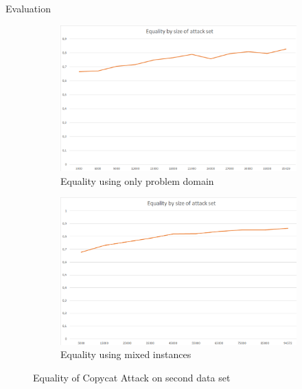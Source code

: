 \documentclass[10pt]{beamer}
\begin{document}
\begin{frame}[fragile]{Evaluation}
       \begin{figure}[h!]
            \centering
            \begin{subfigure}[c]{0.49\textwidth}
                \centering
                \includegraphics[width=1\textwidth]{exercise_3/paper/images/Equality_copy_cat_domain.png}
                \caption{Equality using only problem domain}
                \label{fig:Equality_cat_domain}
            \end{subfigure}
            \begin{subfigure}[c]{0.49\textwidth}
                \centering
                \includegraphics[width=1\textwidth]{exercise_3/paper/images/Equality_copy_cat.png}
                \caption{Equality using mixed instances}
                \label{fig:Equality_cat_mix}
            \end{subfigure}
            \caption{Equality of Copycat Attack on second data set}
            \label{fig:equality_cat}
        \end{figure}
\end{frame}
\end{document}
